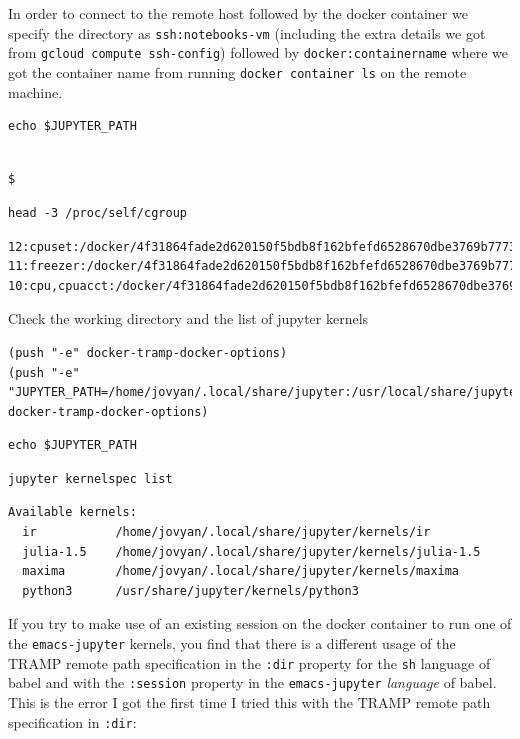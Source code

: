 \documentclass[11pt]{article}
\begin{document}
In order to connect to the remote host followed by the docker container we specify the directory as \texttt{ssh:notebooks-vm} (including the extra details we got from \texttt{gcloud compute ssh-config}) followed by \texttt{docker:containername} where we got the container name from running \texttt{docker container ls} on the remote machine.

\begin{verbatim}
echo $JUPYTER_PATH
\end{verbatim}

\begin{verbatim}

$
\end{verbatim}


\begin{verbatim}
head -3 /proc/self/cgroup
\end{verbatim}

\begin{verbatim}
12:cpuset:/docker/4f31864fade2d620150f5bdb8f162bfefd6528670dbe3769b7773570931445ff
11:freezer:/docker/4f31864fade2d620150f5bdb8f162bfefd6528670dbe3769b7773570931445ff
10:cpu,cpuacct:/docker/4f31864fade2d620150f5bdb8f162bfefd6528670dbe3769b7773570931445ff
\end{verbatim}


Check the working directory and the list of jupyter kernels

\begin{verbatim}
(push "-e" docker-tramp-docker-options)
(push "-e" "JUPYTER_PATH=/home/jovyan/.local/share/jupyter:/usr/local/share/jupyter:/usr/share/jupyter" docker-tramp-docker-options)
\end{verbatim}

\begin{verbatim}
echo $JUPYTER_PATH
\end{verbatim}

\begin{verbatim}
jupyter kernelspec list
\end{verbatim}

\begin{verbatim}
Available kernels:
  ir           /home/jovyan/.local/share/jupyter/kernels/ir
  julia-1.5    /home/jovyan/.local/share/jupyter/kernels/julia-1.5
  maxima       /home/jovyan/.local/share/jupyter/kernels/maxima
  python3      /usr/share/jupyter/kernels/python3
\end{verbatim}


If you try to make use of an existing session on the docker container to run one of the \texttt{emacs-jupyter} kernels, you find that there is a different usage of the TRAMP remote path specification in the \texttt{:dir} property for the \texttt{sh} language of babel and with the \texttt{:session} property in the \texttt{emacs-jupyter} \emph{language} of babel. This is the error I got the first time I tried this with the TRAMP remote path specification in \texttt{:dir}:
\end{document}
